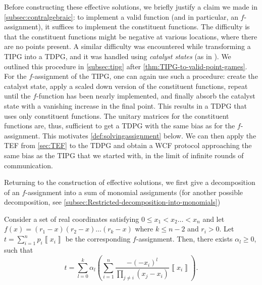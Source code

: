 \documentclass{article}
\begin{document}
Before constructing these effective solutions, we briefly justify a claim we made in \cref{subsec:contralgebraic}: to implement a valid function (and in particular, an $f$-assignment), it suffices to implement the constituent  functions. The difficulty is that the constituent functions
might be negative at various locations, where there are
no points present. A similar difficulty was encountered while transforming a TIPG into a TDPG, and it was
handled using \emph{catalyst states} %
(as in \cite{Mochon07,ACG+14}). We outlined this procedure in \cref{subsec:tipg} after \cref{thm:TIPG-to-valid-point-games}.
%
For the $f$-assignment of the TIPG,  one can again use such a procedure: create the catalyst state, apply a scaled down version of the constituent functions, repeat until the $f$-function has been nearly implemented, and finally absorb the catalyst state with a vanishing increase in the final point. This results in a TDPG that uses only constituent functions.
%
%
%
%
%
The unitary matrices for the constituent functions are, thus, sufficient to get a TDPG with the same bias as for the $f$-assignment.  This motivates \cref{def:solvingassignment} below. We can then apply the TEF from \cref{sec:TEF} to the TDPG and obtain a WCF protocol
approaching the same bias as the TIPG that we started
with, in the limit of infinite rounds of communication. %

%
%
%


%
%
%
%
%
%
%
%
%
%
%
%

Returning to the construction of effective solutions, we first give a decomposition of an $f$-assignment into a sum of monomial assignments (for another possible decomposition, see \cref{subsec:Restricted-decomposition-into-monomials})
%
%
%

\begin{lemma}
  Consider a set of real coordinates satisfying $0\le x_{1}<x_{2}\dots<x_{n}$
  and let $f(x)=(r_{1}-x)(r_{2}-x)\dots(r_{k}-x)$ where $k\le n-2$ and $r_i>0$.
  Let $t=\sum_{i=1}^{n}p_{i}\left\llbracket x_{i}\right\rrbracket $
  be the corresponding $f$-assignment. Then, there exists $\alpha_{l}\ge0$, such that
  $$
    t=\sum_{l=0}^{k}\alpha_{l}\left(\sum_{i=1}^{n}\frac{-(-x_{i})^{l}}{\prod_{j\neq i}(x_{j}-x_{i})}\left\llbracket x_{i}\right\rrbracket \right).
  $$

  \label{lem:generalMonomialDecomposition}
\end{lemma}
\end{document}
